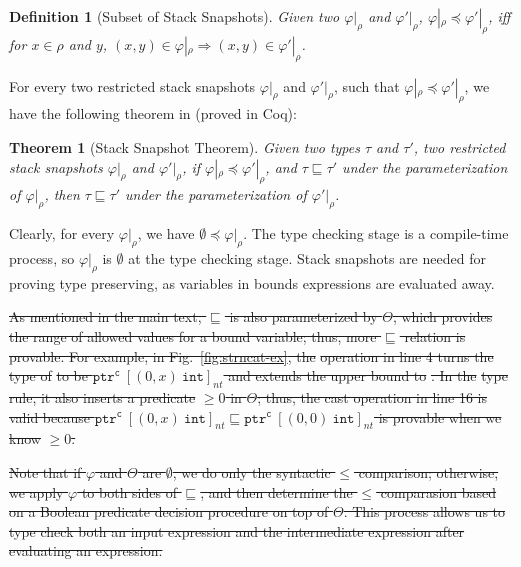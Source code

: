 \documentclass[conference]{IEEEtran}
\newcommand{\code}[1]{\lstinline|#1|}
\newtheorem{defi}{Definition}
\newtheorem{thm}{Theorem}
\newcommand{\checkedc}{\text{Checked C}\xspace}
\newcommand{\tarrayb}[2]{\ensuremath{[{#1}~{#2}]}}
\newcommand{\tntarray}[3]{\tntarrayb{({#1},{#2})}{#3}}
\newcommand{\tntarrayb}[2]{\tarrayb{#1}{#2}_{nt}}
\newcommand{\tptr}[2]{\ensuremath{\mathtt{ptr}^{#2}~{#1}}}
\newcommand{\tntarrayptr}[4]{{\tptr{\tntarray{#1}{#2}{#3}}{#4}}}
\newcommand{\tint}{\ensuremath{\mathtt{int}}}
\newcommand{\cmode}{\texttt{c}}
\providecommand{\DIFdel}[1]{{\protect\color{red}\sout{#1}}}                      %
\providecommand{\DIFdelbegin}{} %
\newcommand{\DIFscaledelfig}{0.5}
\newlength{\DIFdelgraphicswidth} %
\newlength{\DIFdelgraphicsheight} %
\newcommand{\DIFdelincludegraphics}[2][]{%
\sbox{\DIFdelgraphicsbox}{\DIFOincludegraphics[#1]{#2}}%
\settoboxwidth{\DIFdelgraphicswidth}{\DIFdelgraphicsbox} %
\settoboxtotalheight{\DIFdelgraphicsheight}{\DIFdelgraphicsbox} %
\scalebox{\DIFscaledelfig}{%
\parbox[b]{\DIFdelgraphicswidth}{\usebox{\DIFdelgraphicsbox}\\[-\baselineskip] \rule{\DIFdelgraphicswidth}{0em}}\llap{\resizebox{\DIFdelgraphicswidth}{\DIFdelgraphicsheight}{%
\setlength{\unitlength}{\DIFdelgraphicswidth}%
\begin{picture}(1,1)%
\thicklines\linethickness{2pt} %
{\color[rgb]{1,0,0}\put(0,0){\framebox(1,1){}}}%
{\color[rgb]{1,0,0}\put(0,0){\line( 1,1){1}}}%
{\color[rgb]{1,0,0}\put(0,1){\line(1,-1){1}}}%
\end{picture}%
}\hspace*{3pt}}} %
} %
\DeclareRobustCommand{\DIFdelbegin}{\DIFOdelbegin \let\includegraphics\DIFdelincludegraphics} %
\begin{document}
\begin{defi}[Subset of Stack Snapshots]
  Given two $\varphi|_{\rho}$ and $\varphi'|_{\rho}$,
  $\varphi|_{\rho} \preceq \varphi'|_{\rho}$, iff for $x\in\rho$ and
  $y$,
  $(x,y) \in \varphi|_{\rho} \Rightarrow (x,y) \in \varphi'|_{\rho}$.
\end{defi}

For every two restricted stack snapshots $\varphi|_{\rho}$ and
$\varphi'|_{\rho}$, such that
$\varphi|_{\rho} \preceq \varphi'|_{\rho}$, we have the following
theorem in \checkedc (proved in Coq):

\begin{thm}[Stack Snapshot Theorem]
  Given two types $\tau$ and $\tau'$, two restricted stack snapshots
  $\varphi|_{\rho}$ and $\varphi'|_{\rho}$, if
  $\varphi|_{\rho}\preceq \varphi'|_{\rho}$, and
  $\tau \sqsubseteq \tau'$ under the parameterization of
  $\varphi|_{\rho}$, then $\tau \sqsubseteq \tau'$ under the
  parameterization of $\varphi'|_{\rho}$.
\end{thm}

Clearly, for every $\varphi|_{\rho}$, we have
$\emptyset \preceq \varphi|_{\rho}$. The type checking stage is a
compile-time process, so $\varphi|_{\rho}$
is $\emptyset$ at the type checking stage. Stack snapshots are needed
for proving type preserving, as variables in bounds expressions are
evaluated away.


\DIFdelbegin \DIFdel{As mentioned in the main text, $\sqsubseteq$ is also parameterized by
$\Theta$, which provides the range of allowed values for a bound
variable; thus, more $\sqsubseteq$ relation is provable. For example,
in Fig.~\ref{fig:strncat-ex}, the }%
\DIFdel{operation in line 4
turns the type of }%
\DIFdel{to be $\tntarrayptr{0}{x}{\tint}{\cmode}$
and extends the upper bound to }%
\DIFdel{. In the }%
\DIFdel{type
rule, it also inserts a predicate }%
\DIFdel{$\ge 0$ in $\Theta$; thus,
the cast operation in line 16 is valid because
$\tntarrayptr{0}{x}{\tint}{\cmode} \sqsubseteq
\tntarrayptr{0}{0}{\tint}{\cmode}$ is provable when we know
}%
\DIFdel{$\ge 0$.
}%

\DIFdel{Note that if $\varphi$ and $\Theta$ are $\emptyset$, we do only the
syntactic $\le$ comparison; otherwise, we apply $\varphi$ to both
sides of $\sqsubseteq$, and then determine the $\le$ comparasion based
on a Boolean predicate decision procedure on top of $\Theta$. This
process allows us to type check both an input expression and the
intermediate expression after evaluating an expression. 
}%
\end{document}
